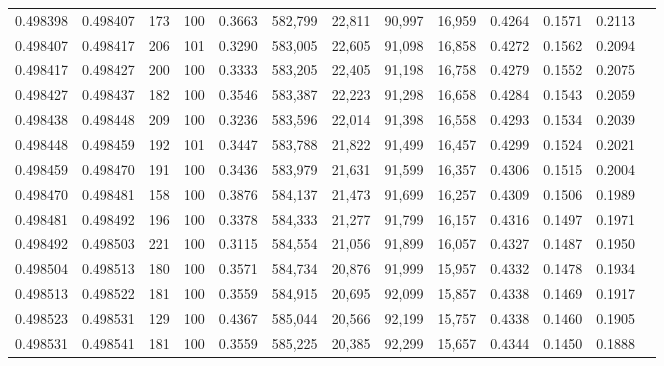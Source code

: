 \begin{tabular}{rrrrrrrrrrrrr}
0.498398 & 0.498407 &   173 & 100 &                                     0.3663 & 582,799 &  22,811 &  90,997 &  16,959 & 0.4264 & 0.1571 & 0.2113 \\
0.498407 & 0.498417 &   206 & 101 &                                     0.3290 & 583,005 &  22,605 &  91,098 &  16,858 & 0.4272 & 0.1562 & 0.2094 \\
0.498417 & 0.498427 &   200 & 100 &                                     0.3333 & 583,205 &  22,405 &  91,198 &  16,758 & 0.4279 & 0.1552 & 0.2075 \\
0.498427 & 0.498437 &   182 & 100 &                                     0.3546 & 583,387 &  22,223 &  91,298 &  16,658 & 0.4284 & 0.1543 & 0.2059 \\
0.498438 & 0.498448 &   209 & 100 &                                     0.3236 & 583,596 &  22,014 &  91,398 &  16,558 & 0.4293 & 0.1534 & 0.2039 \\
0.498448 & 0.498459 &   192 & 101 &                                     0.3447 & 583,788 &  21,822 &  91,499 &  16,457 & 0.4299 & 0.1524 & 0.2021 \\
0.498459 & 0.498470 &   191 & 100 &                                     0.3436 & 583,979 &  21,631 &  91,599 &  16,357 & 0.4306 & 0.1515 & 0.2004 \\
0.498470 & 0.498481 &   158 & 100 &                                     0.3876 & 584,137 &  21,473 &  91,699 &  16,257 & 0.4309 & 0.1506 & 0.1989 \\
0.498481 & 0.498492 &   196 & 100 &                                     0.3378 & 584,333 &  21,277 &  91,799 &  16,157 & 0.4316 & 0.1497 & 0.1971 \\
0.498492 & 0.498503 &   221 & 100 &                                     0.3115 & 584,554 &  21,056 &  91,899 &  16,057 & 0.4327 & 0.1487 & 0.1950 \\
0.498504 & 0.498513 &   180 & 100 &                                     0.3571 & 584,734 &  20,876 &  91,999 &  15,957 & 0.4332 & 0.1478 & 0.1934 \\
0.498513 & 0.498522 &   181 & 100 &                                     0.3559 & 584,915 &  20,695 &  92,099 &  15,857 & 0.4338 & 0.1469 & 0.1917 \\
0.498523 & 0.498531 &   129 & 100 &                                     0.4367 & 585,044 &  20,566 &  92,199 &  15,757 & 0.4338 & 0.1460 & 0.1905 \\
0.498531 & 0.498541 &   181 & 100 &                                     0.3559 & 585,225 &  20,385 &  92,299 &  15,657 & 0.4344 & 0.1450 & 0.1888 \\

\end{tabular}

